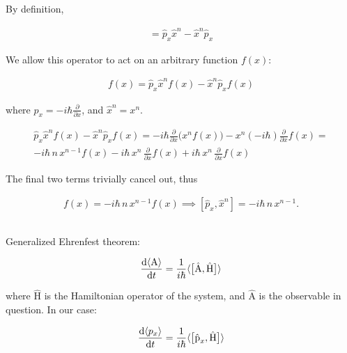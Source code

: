 \subsection{}

By definition,

\begin{align*}
  [\hat{p}_x, \hat{x}^n] = \hat{p}_x \hat{x}^n - \hat{x}^n \hat{p}_x
\end{align*}

We allow this operator to act on an arbitrary function $f(x)$:

\begin{align*}
  [\hat{p}_x, \hat{x}^n] f(x) = \hat{p}_x \hat{x}^n f(x) - \hat{x}^n \hat{p}_x f(x)
\end{align*}

where $\hat{p}_x = -i\hbar \frac{\partial}{\partial{x}}$, and $\hat{x}^n = x^n$.

\begin{align*}
  \hat{p}_x \hat{x}^n f(x) - \hat{x}^n \hat{p}_x f(x) =
    -i\hbar \frac{\partial}{\partial{x}} \big( x^n f(x) \big) - x^n (-i\hbar) \frac{\partial}{\partial{x}} f(x) = \\
    -i\hbar \, n \, x^{n-1} f(x) - i\hbar \, x^n \, \frac{\partial}{\partial{x}} f(x) + i\hbar \, x^n \, \frac{\partial}{\partial{x}} f(x)
\end{align*}

The final two terms trivially cancel out, thus

\begin{align*}
  [\hat{p}_x, \hat{x}^n] f(x) = -i\hbar \, n \, x^{n-1} f(x) \implies [\hat{p}_x, \hat{x}^n] = -i\hbar \, n \, x^{n-1}.
\end{align*}

\subsection{}

Generalized Ehrenfest theorem:

\begin{align*}
  \frac{\dif{\langle \textrm{A} \rangle}}{\dif{t}} = \frac{1}{i\hbar} \langle \big[ \hat{\textrm{A}}, \hat{\textrm{H}} \big] \rangle
\end{align*}

where $\hat{\textrm{H}}$ is the Hamiltonian operator of the system, and $\hat{\textrm{A}}$ is the observable in question. In our case:

\begin{align*}
  \frac{\dif{\langle p_x \rangle}}{\dif{t}} = \frac{1}{i\hbar} \langle \big[ \hat{\textrm{p}}_x, \hat{\textrm{H}} \big] \rangle
\end{align*}

